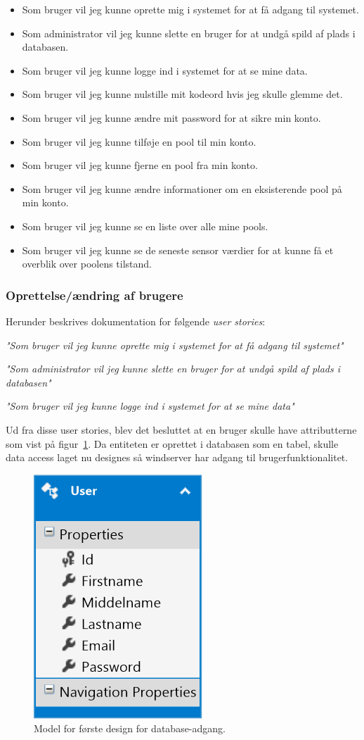\begin{itemize}
	\item Som bruger vil jeg kunne oprette mig i systemet for at få adgang til systemet.
	\item Som administrator vil jeg kunne slette en bruger for at undgå spild af plads i databasen.
	\item Som bruger vil jeg kunne logge ind i systemet for at se mine data.
	\item Som bruger vil jeg kunne nulstille mit kodeord hvis jeg skulle glemme det.
	\item Som bruger vil jeg kunne ændre mit password for at sikre min konto.
	\item Som bruger vil jeg kunne tilføje en pool til min konto.
	\item Som bruger vil jeg kunne fjerne en pool fra min konto.
	\item Som bruger vil jeg kunne ændre informationer om en eksisterende pool på min konto.
	\item Som bruger vil jeg kunne se en liste over alle mine pools.
	\item Som bruger vil jeg kunne se de seneste sensor værdier for at kunne få et overblik over poolens tilstand.
\end{itemize}

\subsubsection{Oprettelse/ændring af brugere}
Herunder beskrives dokumentation for følgende \textit{user stories}:

\textit{"Som bruger vil jeg kunne oprette mig i systemet for at få adgang til systemet"}

\textit{"Som administrator vil jeg kunne slette en bruger for at undgå spild af plads i databasen"}

\textit{"Som bruger vil jeg kunne logge ind i systemet for at se mine data"}

Ud fra disse user stories, blev det besluttet at en bruger skulle have attributterne som vist på figur~\ref{fig:database_model_1}. Da entiteten er oprettet i databasen som en tabel, skulle data access laget nu designes så \gls{windserver} har adgang til brugerfunktionalitet.


\begin{figure}[H]
	\centering
	\includegraphics[width=0.25\linewidth]{figs/design/database_model_1}
	\caption{Model for første design for database-adgang.}
	\label{fig:database_model_1}
\end{figure}

